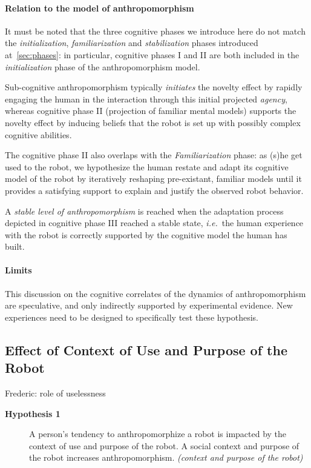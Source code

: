 \documentclass[lettersize, apacite, twoside, HRI]{apa_HRI}
\newcommand{\ie}{{\textit{i.e.~}}}
\begin{document}
\paragraph{Relation to the model of anthropomorphism} It must be noted that the
three cognitive phases we introduce here do not match the
\emph{initialization}, \emph{familiarization} and \emph{stabilization} phases
introduced at~\ref{sec:phases}: in particular, cognitive phases I and II are
both included in the \emph{initialization} phase of the anthropomorphism model.

Sub-cognitive anthropomorphism typically \emph{initiates} the novelty effect by
rapidly engaging the human in the interaction through this initial projected
\emph{agency}, whereas cognitive phase II (projection of familiar mental
models) supports the novelty effect by inducing beliefs that the robot is set
up with possibly complex cognitive abilities.

The cognitive phase II also overlaps with the \emph{Familiarization} phase: as
(s)he get used to the robot, we hypothesize the human restate and adapt its
cognitive model of the robot by iteratively reshaping pre-existant, familiar
models until it provides a satisfying support to explain and justify the
observed robot behavior.

A \emph{stable level of anthropomorphism} is reached when the adaptation
process depicted in cognitive phase III reached a stable state, \ie the human
experience with the robot is correctly supported by the cognitive model the
human has built.

\paragraph{Limits} This discussion on the cognitive correlates of the dynamics
of anthropomorphism are speculative, and only indirectly supported by
experimental evidence. New experiences need to be designed to specifically test
these hypothesis.

\subsection{Effect of Context of Use and Purpose of the Robot}
\label{sec:8.1}
Frederic: role of uselessness


\begin{description}
	\item[\textbf{Hypothesis 1}] A person's tendency to anthropomorphize a robot is impacted by the context of use and purpose of the robot. A social context and purpose of the robot increases anthropomorphism. \textit{(context and purpose of the robot)}
\end{description}
\end{document}

